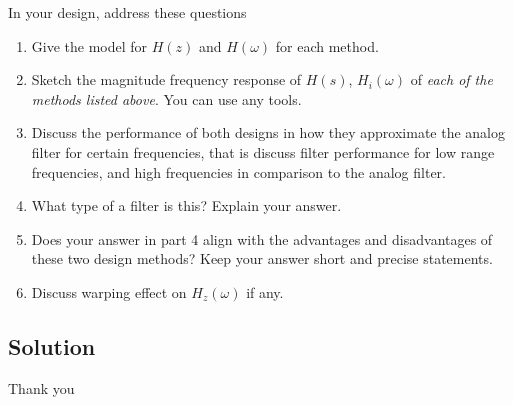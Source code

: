 \documentclass[12pt,letterpaper]{article}
\begin{document}
In your design, address these questions
\begin{enumerate}
    \item Give the model for \( H(z) \) and \( H(\omega) \) for each method.
    \item Sketch the magnitude frequency response of \( H(s) \), \( H_i(\omega) \) of \textit{each of the methods listed above}. You can use any tools.
    \item Discuss the performance of both designs in how they approximate the analog filter for certain frequencies, that is discuss filter performance for low range frequencies, and high frequencies in comparison to the analog filter.
    \item What type of a filter is this? Explain your answer.
    \item Does your answer in part 4 align with the advantages and disadvantages of these two design methods? Keep your answer short and precise statements.
    \item Discuss warping effect on \( H_z(\omega) \) if any.
\end{enumerate}
\newpage
\subsection*{Solution}







\newpage
Thank you
\end{document}
